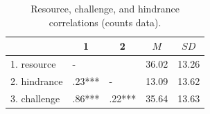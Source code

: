 \documentclass[
  man]{apa6}
\begin{document}
\begin{table}[tbp]

\begin{center}
\begin{threeparttable}

\caption{\label{tab:cortab}Resource, challenge, and hindrance correlations (counts data).}

\begin{tabular}{lllll}
\toprule
 & \multicolumn{1}{c}{1} & \multicolumn{1}{c}{2} & \multicolumn{1}{c}{$M$} & \multicolumn{1}{c}{$SD$}\\
\midrule
1. resource & - &  & 36.02 & 13.26\\
2. hindrance & .23*** & - & 13.09 & 13.62\\
3. challenge & .86*** & .22*** & 35.64 & 13.63\\
\bottomrule
\end{tabular}

\end{threeparttable}
\end{center}

\end{table}
\end{document}
